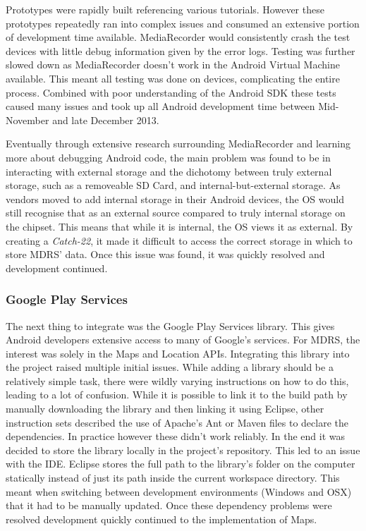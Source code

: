 \documentclass{l3proj}
\begin{document}
Prototypes were rapidly built referencing various tutorials. However these prototypes repeatedly ran into complex issues and consumed an extensive portion of development time available. MediaRecorder would consistently crash the test devices with little debug information given by the error logs. Testing was further slowed down as MediaRecorder doesn't work in the Android Virtual Machine available. This meant all testing was done on devices, complicating the entire process. Combined with poor understanding of the Android SDK these tests caused many issues and took up all Android development time between Mid-November and late December 2013.

Eventually through extensive research surrounding MediaRecorder and learning more about debugging Android code, the main problem was found to be in interacting with external storage and the dichotomy between truly external storage, such as a removeable SD Card, and internal-but-external storage. As vendors moved to add internal storage in their Android devices, the OS would still recognise that as an external source compared to truly internal storage on the chipset. This means that while it is internal, the OS views it as external. By creating a \textit{Catch-22}, it made it difficult to access the correct storage in which to store MDRS' data. Once this issue was found, it was quickly resolved and development continued.

\subsubsection{Google Play Services}    The next thing to integrate was the Google Play Services library. This gives Android developers extensive access to many of Google's services. For MDRS, the interest was solely in the Maps and Location APIs. Integrating this library into the project raised multiple initial issues. While adding a library should be a relatively simple task, there were wildly varying instructions on how to do this, leading to a lot of confusion. While it is possible to link it to the build path by manually downloading the library and then linking it using Eclipse, other instruction sets described the use of Apache's Ant or Maven files to declare the dependencies. In practice however these didn't work reliably. In the end it was decided to store the library locally in the project's repository. This led to an issue with the IDE. Eclipse stores the full path to the library's folder on the computer statically instead of just its path inside the current workspace directory. This meant when switching between development environments (Windows and OSX) that it had to be manually updated. Once these dependency problems were resolved development quickly continued to the implementation of Maps.
\end{document}
